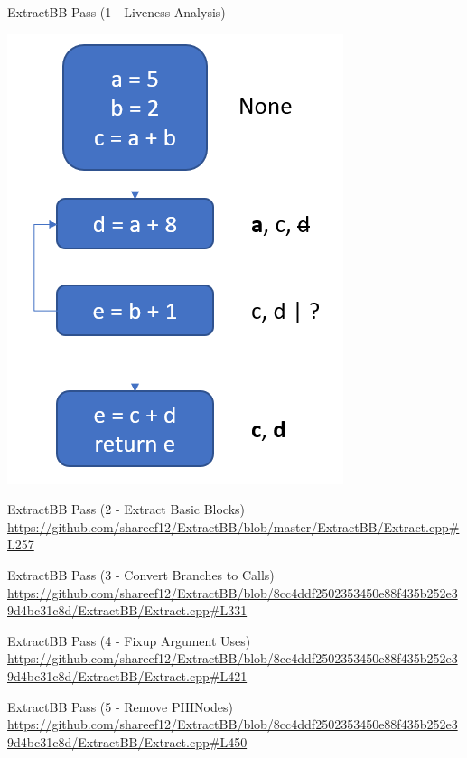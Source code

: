 \documentclass{beamer}
\begin{document}
\begin{frame}{ExtractBB Pass (1 - Liveness Analysis)}
\begin{overprint}
        \centering
        \includegraphics[height=0.8\textheight]{images/liveness3.png}
    \end{overprint}
\end{frame}

\begin{frame}[fragile]{ExtractBB Pass (2 - Extract Basic Blocks)}
    \url{https://github.com/shareef12/ExtractBB/blob/master/ExtractBB/Extract.cpp#L257}
\end{frame}

\begin{frame}[fragile]{ExtractBB Pass (3 - Convert Branches to Calls)}
    \url{https://github.com/shareef12/ExtractBB/blob/8cc4ddf2502353450e88f435b252e39d4bc31c8d/ExtractBB/Extract.cpp#L331}
\end{frame}

\begin{frame}[fragile]{ExtractBB Pass (4 - Fixup Argument Uses)}
    \url{https://github.com/shareef12/ExtractBB/blob/8cc4ddf2502353450e88f435b252e39d4bc31c8d/ExtractBB/Extract.cpp#L421}
\end{frame}

\begin{frame}[fragile]{ExtractBB Pass (5 - Remove PHINodes)}
    \url{https://github.com/shareef12/ExtractBB/blob/8cc4ddf2502353450e88f435b252e39d4bc31c8d/ExtractBB/Extract.cpp#L450}
\end{frame}
\end{document}
